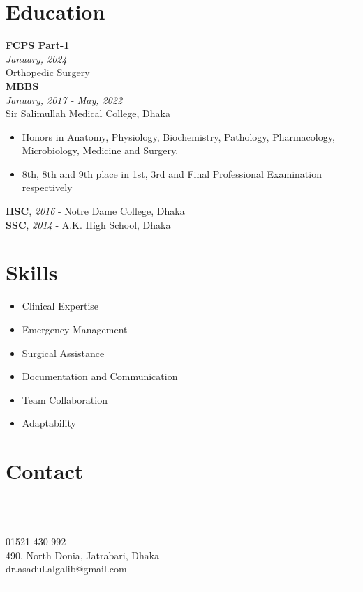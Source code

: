 \documentclass[a4paper,12pt]{article}
\newcommand{\resumeentry}[2]{
    \textbf{#1} \\
    \textit{#2}
}
\begin{document}
\begin{minipage}[t][10.2cm]{\textwidth}
\raggedright
\section*{Education}
\resumeentry{FCPS Part-1}{January, 2024}\\ Orthopedic Surgery \vspace{0.3cm}\\
\resumeentry{MBBS}{January, 2017 - May, 2022}\\ Sir Salimullah Medical College, Dhaka
\begin{itemize}[left=0em, itemsep=0pt, parsep=0pt]
  \item Honors in Anatomy, Physiology, Biochemistry, Pathology, Pharmacology, Microbiology, Medicine and Surgery.
	\item 8th, 8th and 9th place in 1st, 3rd and Final Professional Examination respectively
\end{itemize}
\textbf{HSC}, \textit{2016} - Notre Dame College, Dhaka \\
\textbf{SSC}, \textit{2014} - A.K. High School, Dhaka \\
\end{minipage}
\begin{minipage}[t][6cm]{0.45\textwidth}
\raggedright
\section*{Skills}
\begin{itemize}[left=0em, itemsep=0pt, parsep=0pt]
  \item Clinical Expertise
	\item Emergency Management
	\item Surgical Assistance
	\item Documentation and Communication
	\item Team Collaboration
	\item Adaptability
\end{itemize}
\end{minipage}
\hspace{0.1\textwidth}
\begin{minipage}[t][6cm]{0.45\textwidth}
	\section*{Contact}
  \begin{minipage}[h][3cm][t]{0.08\textwidth}
      \faPhone\\
      \faMapMarker\\
      \faEnvelopeO
  \end{minipage}
  \begin{minipage}[h][3cm][t]{0.9\textwidth}
      01521 430 992\\
      490, North Donia, Jatrabari, Dhaka\\
      dr.asadul.algalib@gmail.com
  \end{minipage}
\end{minipage}
\begin{minipage}[b][6cm]{0.3\textwidth}
\par\noindent\rule{\textwidth}{0.4pt}
\end{minipage}
\end{document}
